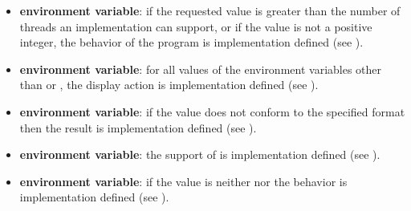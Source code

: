 \begin{itemize}
\item {} \textbf{environment variable}: if the requested value is greater than
the number of threads an implementation can support, or if the value is not a positive
integer, the behavior of the program is implementation defined (see ).

\item {} \textbf{environment variable}: for all values of the environment variables other than  or , the display action is implementation defined (see
).

\item {} \textbf{environment variable}: if the value does not
conform to the specified format then the result is implementation defined (see
).

\item {} \textbf{environment variable}: the support of  is implementation defined (see
).

\item {} \textbf{environment variable}: if the value is neither
 nor  the behavior is implementation defined (see
).

\end{itemize}



